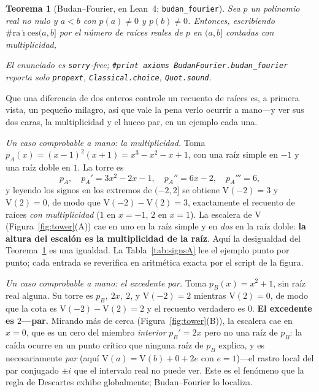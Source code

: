 \documentclass[11pt]{article}
\newtheorem{theorem}{Teorema}
\newcommand{\lean}[1]{\texttt{#1}}
\newcommand{\V}{\mathrm{V}}
\newcommand{\keyeq}[1]{\begin{center}\keybox{$\displaystyle #1$}\end{center}}
\begin{document}
\begin{theorem}[Budan--Fourier, en Lean~4; \lean{budan\_fourier}]\label{thm:bf}
Sea $p$ un polinomio real no nulo y $a<b$ con $p(a)\ne0$ y $p(b)\ne0$. Entonces, escribiendo
$\#\mathrm{ra\acute{\imath}ces}(a,b]$ por el n\'umero de ra\'ices reales de $p$ en $(a,b]$ contadas con
multiplicidad,
\keyeq{\#\mathrm{ra\acute{\imath}ces}(a,b]\ \le\ \V_p(a)-\V_p(b)\quad\text{y}\quad
  \V_p(a)-\V_p(b)-\#\mathrm{ra\acute{\imath}ces}(a,b]\ \text{es par.}}
El enunciado es \lean{sorry}-free; \lean{\#print axioms BudanFourier.budan\_fourier} reporta solo
\lean{propext}, \lean{Classical.choice}, \lean{Quot.sound}.
\end{theorem}

Que una diferencia de dos enteros controle un recuento de ra\'ices es, a primera vista, un peque\~no
milagro, as\'i que vale la pena verlo ocurrir a mano---y ver sus dos caras, la multiplicidad y el
hueco par, en un ejemplo cada una.

\emph{Un caso comprobable a mano: la multiplicidad.} Toma $p_A(x)=(x-1)^2(x+1)=x^3-x^2-x+1$, con una
ra\'iz simple en $-1$ y una ra\'iz doble en $1$. La torre es
\[
  p_A,\quad p_A'=3x^2-2x-1,\quad p_A''=6x-2,\quad p_A'''=6,
\]
y leyendo los signos en los extremos de $(-2,2]$ se obtiene $\V(-2)=3$ y $\V(2)=0$, de modo que
$\V(-2)-\V(2)=3$, exactamente el recuento de ra\'ices \emph{con multiplicidad} ($1$ en $x=-1$, $2$ en
$x=1$). La escalera de $\V$ (Figura~\ref{fig:tower}(A)) cae en uno en la ra\'iz simple y en \emph{dos}
en la ra\'iz doble: \textbf{la altura del escal\'on es la multiplicidad de la ra\'iz}. Aqu\'i la
desigualdad del Teorema~\ref{thm:bf} es una igualdad. La Tabla~\ref{tab:signsA} lee el ejemplo punto
por punto; cada entrada se reverifica en aritm\'etica exacta por el script de la figura.

\emph{Un caso comprobable a mano: el excedente par.} Toma $p_B(x)=x^2+1$, sin ra\'iz real alguna. Su
torre es $p_B,\ 2x,\ 2$, y $\V(-2)=2$ mientras $\V(2)=0$, de modo que la cota es $\V(-2)-\V(2)=2$ y el
recuento verdadero es $0$. \textbf{El excedente es $2$---par.} Mirando m\'as de cerca
(Figura~\ref{fig:tower}(B)), la escalera cae en $x=0$, que es un cero del miembro \emph{interior}
$p_B'=2x$ pero no una ra\'iz de $p_B$: la ca\'ida ocurre en un punto cr\'itico que ninguna ra\'iz de
$p_B$ explica, y es necesariamente \emph{par} (aqu\'i $\V(a)=\V(b)+0+2e$ con $e=1$)---el rastro local
del par conjugado $\pm i$ que el intervalo real no puede ver. Este es el fen\'omeno que la regla de
Descartes exhibe globalmente; Budan--Fourier lo localiza.
\end{document}
